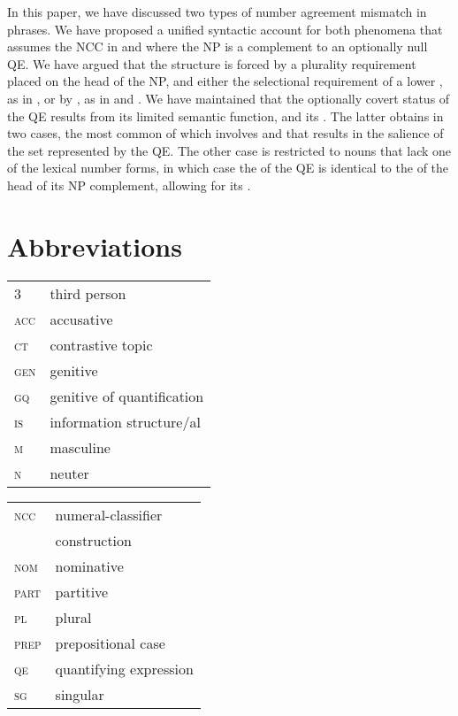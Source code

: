 \documentclass[output=paper,modfonts,newtxmath,hidelinks]{langscibook}
\begin{document}
In this paper, we have discussed two types of number agreement mismatch in   phrases. We have proposed a unified syntactic account for both phenomena that assumes the NCC in  and  where the  NP is a complement to an optionally null QE. We have argued that the structure is forced by a plurality requirement placed on the head of the NP, and either the selectional requirement of a lower , as in , or by , as in  and . We have maintained that the optionally covert status of the QE results from its limited semantic function, and its . The latter obtains in two cases, the most common of which involves   and   that results in the salience of the set represented by the QE. The other case is restricted to nouns that lack one of the lexical number forms, in which case the  of the QE is identical to the  of the head of its NP complement, allowing for its . 


\section*{Abbreviations}

\begin{tabularx}{.5\textwidth}{@{}lQ@{}}
\textsc{3}&third person\\
\textsc{acc}&{accusative}\\
\textsc{ct}&{contrastive} topic\\
\textsc{gen}&{genitive}\\
\textsc{gq}&{genitive} of quantification\\
\textsc{is}&{information structure}/al\\
\textsc{m}&{masculine}\\
\textsc{n}&{neuter}\\
\end{tabularx}%
\begin{tabularx}{.5\textwidth}{@{}lQ@{}}
\textsc{ncc}&numeral-classifier\\
&construction\\
\textsc{nom}&{nominative}\\
\textsc{part}&{partitive}\\
\textsc{pl}&{plural}\\
\textsc{prep}&prepositional case\\
\textsc{qe}&quantifying expression\\
\textsc{sg}&singular\\
\end{tabularx}
\end{document}
